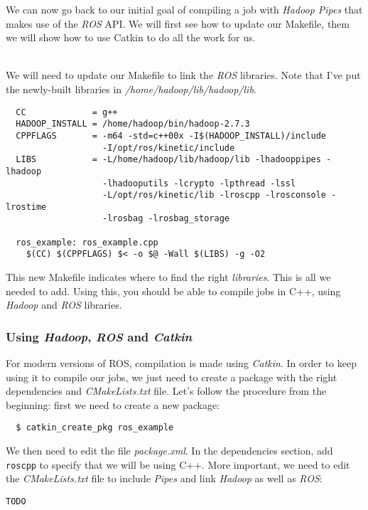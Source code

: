 \documentclass[a4paper, 12pt]{article}
\begin{document}
We can now go back to our initial goal of compiling a job with \textit{Hadoop Pipes} that makes use of the \textit{ROS} API. We will first see how to update our Makefile, them we will show how to use Catkin to do all the work for us.

~\\
We will need to update our Makefile to link the \textit{ROS} libraries. Note that I've put the newly-built libraries in \textit{/home/hadoop/lib/hadoop/lib}.

\begin{verbatim}
  CC             = g++
  HADOOP_INSTALL = /home/hadoop/bin/hadoop-2.7.3
  CPPFLAGS       = -m64 -std=c++00x -I$(HADOOP_INSTALL)/include
                   -I/opt/ros/kinetic/include
  LIBS           = -L/home/hadoop/lib/hadoop/lib -lhadooppipes -lhadoop
                   -lhadooputils -lcrypto -lpthread -lssl
                   -L/opt/ros/kinetic/lib -lroscpp -lrosconsole -lrostime
                   -lrosbag -lrosbag_storage

  ros_example: ros_example.cpp
    $(CC) $(CPPFLAGS) $< -o $@ -Wall $(LIBS) -g -O2
\end{verbatim}

This new Makefile indicates where to find the right \textit{libraries}. This is all we needed to add. Using this, you should be able to compile jobs in C++, using \textit{Hadoop} and \textit{ROS} libraries.

    \subsubsection{Using \textit{Hadoop}, \textit{ROS} and \textit{Catkin}}

For modern versions of ROS, compilation is made using \textit{Catkin}. In order to keep using it to compile our jobs, we just need to create a package with the right dependencies and \textit{CMakeLists.txt} file. Let's follow the procedure from the beginning: first we need to create a new package:

\begin{verbatim}
  $ catkin_create_pkg ros_example
\end{verbatim}

We then need to edit the file \textit{package.xml}. In the dependencies section, add \texttt{roscpp} to specify that we will be using C++. More important, we need to edit the \textit{CMakeLists.txt} file to include \textit{Pipes} and link \textit{Hadoop} as well as \textit{ROS}:

\begin{lstlisting}[style=xml]
  TODO
\end{lstlisting}
\end{document}
